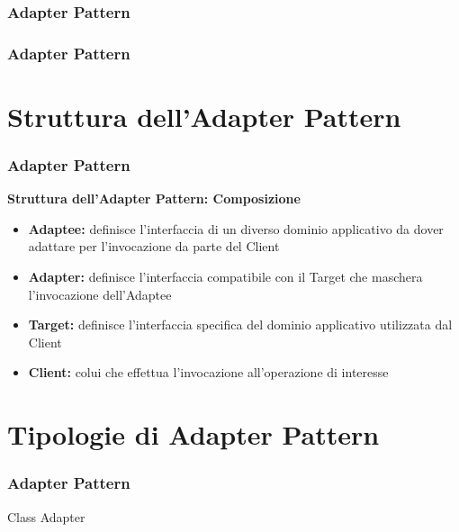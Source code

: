 \documentclass[aspectratio=43]{beamer}
\begin{document}
\begin{frame}
	\frametitle{ Adapter Pattern}
	\begin{figure}[h!]
	\end{figure}
\end{frame}

\begin{frame}
	\frametitle{ Adapter Pattern}
	\begin{figure}[h!]
	\end{figure}
\end{frame}

\section{Struttura dell'Adapter Pattern}

\begin{frame}
	\frametitle{ Adapter Pattern}
	\textbf{Struttura dell'Adapter Pattern: Composizione}\pause
	\begin{itemize}
		\item \textbf{Adaptee:} definisce l’interfaccia di un diverso dominio applicativo da dover adattare per l’invocazione da parte del Client\pause
		\item \textbf{Adapter:} definisce l’interfaccia compatibile con il Target che maschera l’invocazione dell’Adaptee\pause
		\item \textbf{Target:} definisce l’interfaccia specifica del dominio applicativo utilizzata dal Client\pause
		\item \textbf{Client:} colui che effettua l’invocazione all’operazione di interesse
	\end{itemize}
\end{frame}

\section{Tipologie di Adapter Pattern}

\begin{frame}
	\frametitle{ Adapter Pattern}
	\centerline{Class Adapter}
	\begin{figure}[h!]
	\end{figure}
\end{frame}
\end{document}
